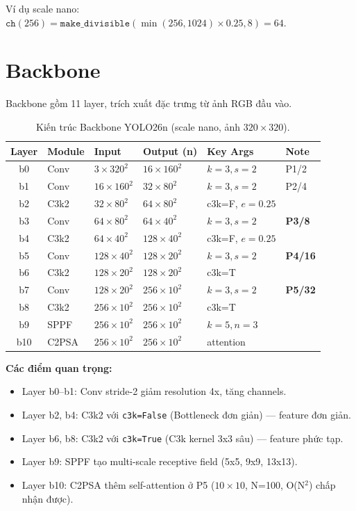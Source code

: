 Ví dụ scale nano: $\texttt{ch}(256) = \texttt{make\_divisible}(\min(256, 1024) \times 0.25, 8) = 64$.

\section{Backbone}
\label{sec:backbone}

Backbone gồm 11 layer, trích xuất đặc trưng từ ảnh RGB đầu vào.

\begin{table}[H]
\centering
\small
\begin{tabular}{clllll}
\toprule
\textbf{Layer} & \textbf{Module} & \textbf{Input} & \textbf{Output (n)} & \textbf{Key Args} & \textbf{Note} \\
\midrule
b0  & Conv   & $3\times320^2$ & $16\times160^2$ & $k\!=\!3, s\!=\!2$ & P1/2 \\
b1  & Conv   & $16\times160^2$ & $32\times80^2$ & $k\!=\!3, s\!=\!2$ & P2/4 \\
b2  & C3k2   & $32\times80^2$ & $64\times80^2$ & c3k=F, $e\!=\!0.25$ & \\
b3  & Conv   & $64\times80^2$ & $64\times40^2$ & $k\!=\!3, s\!=\!2$ & \textbf{P3/8} \\
b4  & C3k2   & $64\times40^2$ & $128\times40^2$ & c3k=F, $e\!=\!0.25$ & \\
b5  & Conv   & $128\times40^2$ & $128\times20^2$ & $k\!=\!3, s\!=\!2$ & \textbf{P4/16} \\
b6  & C3k2   & $128\times20^2$ & $128\times20^2$ & c3k=T & \\
b7  & Conv   & $128\times20^2$ & $256\times10^2$ & $k\!=\!3, s\!=\!2$ & \textbf{P5/32} \\
b8  & C3k2   & $256\times10^2$ & $256\times10^2$ & c3k=T & \\
b9  & SPPF   & $256\times10^2$ & $256\times10^2$ & $k\!=\!5, n\!=\!3$ & \\
b10 & C2PSA  & $256\times10^2$ & $256\times10^2$ & attention & \\
\bottomrule
\end{tabular}
\caption{Kiến trúc Backbone YOLO26n (scale nano, ảnh $320\times320$).}
\label{tab:backbone}
\end{table}

\textbf{Các điểm quan trọng:}
\begin{itemize}
    \item Layer b0--b1: Conv stride-2 giảm resolution 4x, tăng channels.
    \item Layer b2, b4: C3k2 với \texttt{c3k=False} (Bottleneck đơn giản) --- feature đơn giản.
    \item Layer b6, b8: C3k2 với \texttt{c3k=True} (C3k kernel 3x3 sâu) --- feature phức tạp.
    \item Layer b9: SPPF tạo multi-scale receptive field (5x5, 9x9, 13x13).
    \item Layer b10: C2PSA thêm self-attention ở P5 ($10\times10$, N=100, O(N$^2$) chấp nhận được).
\end{itemize}

